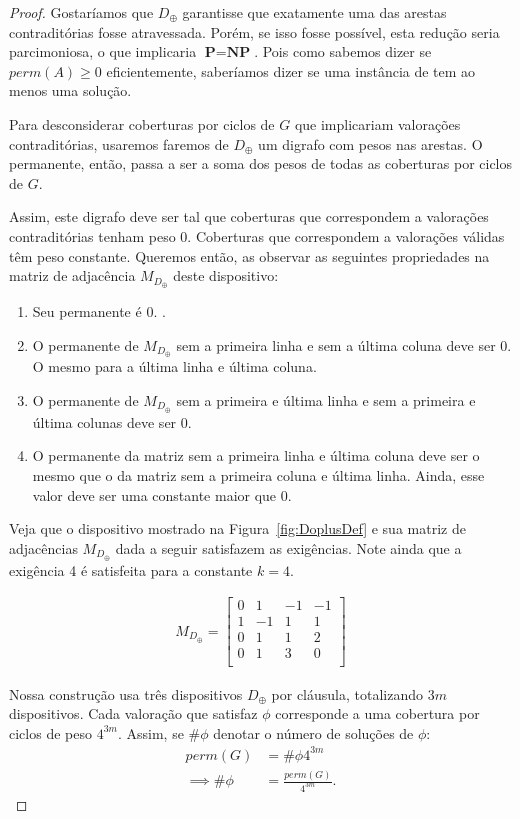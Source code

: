 \documentclass[paper=a4, fontsize=11pt]{scrartcl} %
\numberwithin{equation}{section} %
\numberwithin{figure}{section} %
\numberwithin{table}{section} %
\numberwithin{definition}{section}
\numberwithin{theorem}{section}
\newcommand{\perm}{perm}
\renewcommand{\P}{\textbf{P}\xspace}
\newcommand{\NP}{\textbf{NP}\xspace}
\newcommand{\prob}[1]{\text{\textsc{\textbf{#1}}}}
\begin{document}
\begin{proof}
Gostaríamos que $D_\oplus$ garantisse que exatamente uma das arestas contraditórias fosse atravessada. Porém, se isso fosse possível, esta redução seria parcimoniosa, o que implicaria $ \P = \NP$. Pois como sabemos dizer se $ \perm(A) \geq 0 $ eficientemente, saberíamos dizer se uma instância de \prob{3sat} tem ao menos uma solução.

Para desconsiderar coberturas por ciclos de $G$ que implicariam valorações contraditórias, usaremos faremos de $D_\oplus$ um digrafo com pesos nas arestas. O permanente, então, passa a ser a soma dos pesos de todas as coberturas por ciclos de $G$. 

Assim, este digrafo deve ser tal que coberturas que correspondem a valorações contraditórias tenham peso 0. Coberturas que correspondem a valorações válidas têm peso constante. Queremos então, as observar as seguintes propriedades na matriz de adjacência $M_{D_\oplus}$ deste dispositivo:

\begin{enumerate}
  \item Seu permanente é 0. .
  \item O permanente de $M_{D_\oplus}$ sem a primeira linha e sem a última coluna deve ser 0. O mesmo para a última linha e última coluna.
  \item O permanente de $M_{D_\oplus}$ sem a primeira e última linha e sem a primeira e última colunas deve ser 0.
  \item O permanente da matriz sem a primeira linha e última coluna deve ser o mesmo que o da matriz sem a primeira coluna e última linha. Ainda, esse valor deve ser uma constante maior que 0.
\end{enumerate}

Veja que o dispositivo mostrado na Figura~\ref{fig:DoplusDef} e sua matriz de adjacências $ M_{D_\oplus} $ dada a seguir satisfazem as exigências. Note ainda que a exigência 4 é satisfeita para a constante $k = 4$.

\begin{align*}
M_{D_\oplus} = 
\begin{bmatrix}
0 &  1 & -1 & -1  \\
1 & -1 &  1 &  1  \\
0 &  1 &  1 &  2  \\
0 &  1 &  3 &  0  \\
\end{bmatrix}
\end{align*}

Nossa construção usa três dispositivos $D_\oplus$ por cláusula, totalizando $3m$ dispositivos. Cada valoração que satisfaz $\phi$ corresponde a uma cobertura por ciclos de peso $4^{3m}$. Assim, se $\#\phi$ denotar o número de soluções de $\phi$:
\begin{align*}
\perm(G) &= \#\phi4^{3m} \\
\implies \#\phi &= \frac{\perm(G)}{4^{3m}}.
\end{align*}
 



\end{proof}
\end{document}
